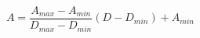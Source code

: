\begin{equation}
	A = \frac{A_{max} - A_{min}}{D_{max} - D_{min}}(D - D_{min}) + A_{min}
	\label{Mapeo}
\end{equation}



